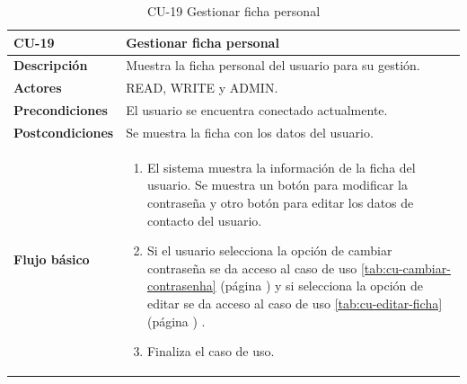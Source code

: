 \begin{table} [H]
    \centering
    \setlength{\leftmargini}{0.4cm}
	\resizebox{14cm}{!} { %
    \begin{tabular}{| m{3cm} | m{11cm} |}   
    \hline
	  \textbf{CU-19} & \textbf{Gestionar ficha personal} \\\hline
	  \textbf{Descripción} & Muestra la ficha personal del usuario para su gestión. \\\hline
	  \textbf{Actores} & READ, WRITE y ADMIN. \\\hline
	  \textbf{Precondiciones} & El usuario se encuentra conectado actualmente. \\\hline
	  \textbf{Postcondiciones} & Se muestra la ficha con los datos del usuario. \\\hline
	  \textbf{Flujo básico} & 
		\begin{enumerate}
	  	\item El sistema muestra la información de la ficha del usuario. Se muestra un botón para modificar la contraseña y otro botón para editar los datos de contacto del usuario.
		\item Si el usuario selecciona la opción de cambiar contraseña se da acceso al caso de uso \ref{tab:cu-cambiar-contrasenha} (página \pageref{tab:cu-cambiar-contrasenha}) y si selecciona la opción de editar se da acceso al caso de uso \ref{tab:cu-editar-ficha} (página \pageref{tab:cu-editar-ficha}) .	  
	   	\item Finaliza el caso de uso.
	  \end{enumerate} 	  	  
	  \\\hline
    \end{tabular}
    } %
    \caption{CU-19 Gestionar ficha personal}
    \label{tab:cu-mostrar-ficha}
\end{table}



